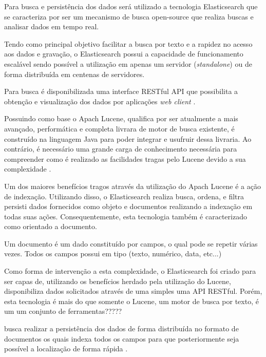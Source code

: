 Para busca e persistência dos dados será utilizado a tecnologia Elasticsearch que se caracteriza por ser um mecanismo de busca open-source que realiza buscas e analisar dados em tempo real.

Tendo como principal objetivo facilitar a busca por texto e a rapidez no acesso aos dados e gravação, o Elasticsearch possui a capacidade de funcionamento escalável sendo possível a utilização em apenas um servidor (\textit{standalone}) ou de forma distribuída em centenas de servidores.  

Para busca é disponibilizada uma interface RESTful API que possibilita a obtenção e visualização dos dados por aplicações \textit{web client} \cite{Gormley:2015}.

Possuindo como base o Apach Lucene, qualifica por ser atualmente a mais avançado, performática e completa livrara de motor de busca existente, é construído na linguagem Java para poder integrar e usufruir dessa livraria. Ao contrário, é necessário uma grande carga de conhecimento necessária para compreender como é realizado as facilidades tragas pelo Lucene devido a sua complexidade \cite{Gormley:2015}.

Um dos maiores benefícios tragos através da utilização do Apach Lucene é a ação de indexação. Utilizando disso, o Elasticsearch realiza busca, ordena, e filtra persisti dados fornecidos como objeto e documentos realizando a indexação em todas suas ações. Consequentemente, esta tecnologia também é caracterizado como orientado a documento.

Um documento é um dado constituído por campos, o qual pode se repetir várias vezes. Todos os campos possui em tipo (texto, numérico, data, etc...) 

Como forma de intervenção a esta complexidade, o Elasticsearch foi criado para  ser capas de, utilizando os benefícios herdado pela utilização do Lucene, disponibiliza dados solicitados através de uma simples uma API RESTful. Porém, esta tecnologia é mais do que somente o Lucene, um motor de busca por texto, é um um conjunto de ferramentas?????

busca realizar a persistência dos dados de forma distribuída no formato de documentos os quais indexa todos os campos para que posteriormente seja possível a localização de forma rápida \cite{Gormley:2015}. 
